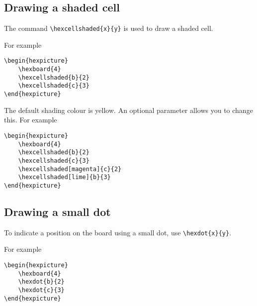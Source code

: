 \documentclass[a4paper,12pt]{article}
\begin{document}
    \subsection{Drawing a shaded cell}
    
    The command \verb|\hexcellshaded{x}{y}| is used to draw a shaded cell. 
    
    For example
    
    \begin{verbatim}\begin{hexpicture}
    \hexboard{4}
    \hexcellshaded{b}{2}
    \hexcellshaded{c}{3}
\end{hexpicture}\end{verbatim}
    
    \begin{hexpicture}
    \end{hexpicture}

    The default shading colour is yellow. An optional parameter allows you to change this. For example
    
    \begin{verbatim}\begin{hexpicture}
    \hexboard{4}
    \hexcellshaded{b}{2}
    \hexcellshaded{c}{3}
    \hexcellshaded[magenta]{c}{2}
    \hexcellshaded[lime]{b}{3}
\end{hexpicture}\end{verbatim}
    
    \begin{hexpicture}
    \end{hexpicture}
    
    \subsection{Drawing a small dot}
    
    To indicate a position on the board using a small dot, use \verb|\hexdot{x}{y}|. 
    
    For example
    
    \begin{verbatim}\begin{hexpicture}
    \hexboard{4}
    \hexdot{b}{2}
    \hexdot{c}{3}
\end{hexpicture}\end{verbatim}
    
\end{document}
